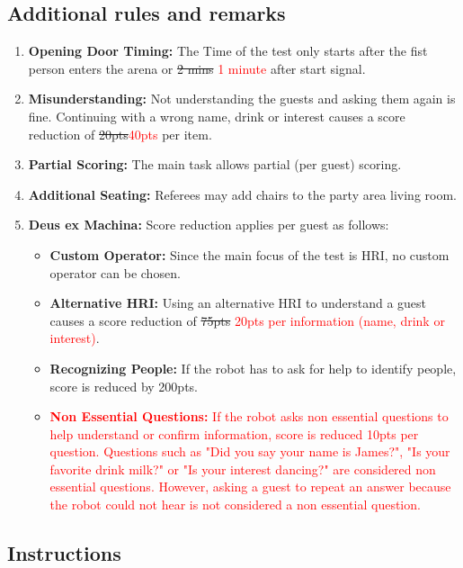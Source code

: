 \subsection*{Additional rules and remarks}
\begin{enumerate}[nosep]
	\item \textbf{Opening Door Timing:} The Time of the test only starts after the fist person enters the arena or \sout{2 mins} \textcolor{red}{1 minute} after start signal.

	\item \textbf{Misunderstanding:} Not understanding the guests and asking them again is fine. Continuing with a wrong name, drink or interest causes a score reduction of \sout{20pts}\textcolor{red}{40pts} per item.
		
	\item \textbf{Partial Scoring:} The main task allows partial (per guest) scoring.

	\item \textbf{Additional Seating:} Referees may add chairs to the party area living room.
	
	\item \textbf{Deus ex Machina:} Score reduction applies per guest as follows:
	\begin{itemize}[nosep]
		\item \textbf{Custom Operator:} Since the main focus of the test is HRI, no custom operator can be chosen.
		\item \textbf{Alternative HRI:} Using an alternative HRI to understand a guest causes a score reduction of \sout{75pts} \textcolor{red}{20pts per information (name, drink or interest)}.
		\item \textbf{Recognizing People:} If the robot has to ask for help to identify people, score is reduced by 200pts. 
		\item \textcolor{red}{\textbf{Non Essential Questions:} If the robot asks non essential questions to help understand or confirm information, score is reduced 10pts per question. 
		Questions such as "Did you say your name is James?", "Is your favorite drink milk?" or "Is your interest dancing?" are considered non essential questions. 
		However, asking a guest to repeat an answer because the robot could not hear is not considered a non essential question.}
	\end{itemize}
\end{enumerate}


\subsection*{Instructions}


